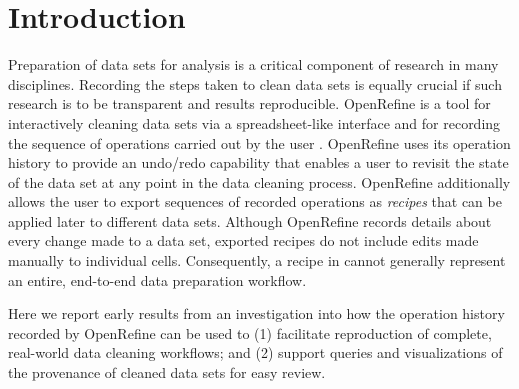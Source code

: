 \section{Introduction}

Preparation of data sets for analysis is a critical component of research in many disciplines. Recording the steps taken to clean data sets is equally crucial if such research is to be transparent and results reproducible. OpenRefine is a tool for interactively cleaning data sets via a spreadsheet-like interface and for recording the sequence of operations carried out by the user \cite{verborgh_using_2013}. OpenRefine uses its operation history to provide an undo/redo capability that enables a user to revisit the state of the data set at any point in the data cleaning process. OpenRefine additionally allows the user to export sequences of recorded operations as \emph{recipes} that can be applied later to different data sets. Although OpenRefine records details about every change made to a data set, exported recipes do not include edits made manually to individual cells. Consequently, a recipe in cannot generally represent an entire, end-to-end data preparation workflow. 

Here we report early results from an investigation into how the operation history recorded by OpenRefine can be used to (1) facilitate reproduction of complete, real-world data cleaning workflows; and (2) support queries and visualizations of the provenance of cleaned data sets for easy review.
